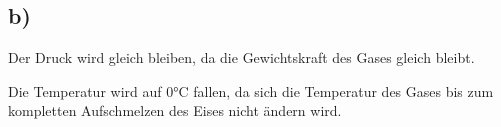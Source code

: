 

\subsection*{b)}

Der Druck wird gleich bleiben, da die Gewichtskraft des Gases gleich bleibt.

Die Temperatur wird auf 0°C fallen, da sich die Temperatur des Gases bis zum kompletten Aufschmelzen des Eises nicht ändern wird.